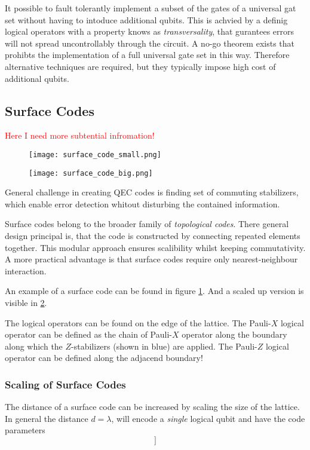 It possible to fault tolerantly implement a subset of the gates of a universal gat set without having to intoduce additional qubits. 
This is achvied by a definig logical operators with a property knows as \textit{transversality}, that gurantees errors will not spread uncontrollably through the circuit.
A no-go theorem exists that prohibts the implementation of a full universal gate set in this way. 
Therefore alternative techniques are required, but they typically impose high cost of additional qubits. \cite{QECintro}


\subsection{Surface Codes}
\textcolor{red}{Here I need more subtential infromation!}
\begin{figure}[h]
    \begin{center}
        \texttt{[image: surface\_code\_small.png]}
    \end{center}
    \label{fig:basic.qc.surface_code_small}
\end{figure}
\begin{figure}[h]
    \begin{center}
        \texttt{[image: surface\_code\_big.png]}
    \end{center}
    \label{fig:basic.qc.surface_code_big}
\end{figure}
General challenge in creating QEC codes is finding set of commuting stabilizers, 
which enable error detection whitout disturbing the contained information.

Surface codes belong to the broader family of \textit{topological codes}.
There general design principal is, that the code is constructed by connecting repeated elements together. 
This modular approach ensures scalibility whilst keeping commutativity.
A more practical advantage is that surface codes require only nearest-neighbour interaction. \cite{QECintro}

An example of a surface code can be found in figure \ref{fig:basic.qc.surface_code_small}.
And a scaled up version is visible in \ref{fig:basic.qc.surface_code_big}. \cite{QECintro}

The logical operators can be found on the edge of the lattice. 
The Pauli-$X$ logical operator can be defined as the chain of Pauli-$X$ operator along the boundary along which the $Z$-stabilizers (shown in blue) are applied.
The Pauli-$Z$ logical operator can be defined along the adjacend boundary! \cite{QECintro}


\subsubsection{Scaling of Surface Codes}
The distance of a surface code can be increased by scaling the size of the lattice.
In general the distance $d=\lambda$, will encode a \textit{single} logical qubit and have the code parameters \cite{QECintro}
\begin{equation}
    [[n = \lambda^2 + (\lambda-1)^2, k=1 ]]
\end{equation}


